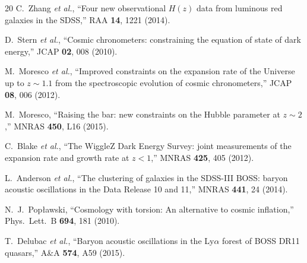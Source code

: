 \documentclass[twocolumn,prd,superscriptaddress,nofootinbib]{revtex4-2}
\begin{document}
\begin{thebibliography}{20}
C.~Zhang \textit{et al.},
``Four new observational $H(z)$ data from luminous red galaxies in the SDSS,''
RAA \textbf{14}, 1221 (2014).

D.~Stern \textit{et al.},
``Cosmic chronometers: constraining the equation of state of dark energy,''
JCAP \textbf{02}, 008 (2010).

M.~Moresco \textit{et al.},
``Improved constraints on the expansion rate of the Universe up to $z \sim 1.1$ from the spectroscopic evolution of cosmic chronometers,''
JCAP \textbf{08}, 006 (2012).

M.~Moresco,
``Raising the bar: new constraints on the Hubble parameter at $z \sim 2$,''
MNRAS \textbf{450}, L16 (2015).

C.~Blake \textit{et al.},
``The WiggleZ Dark Energy Survey: joint measurements of the expansion rate and growth rate at $z < 1$,''
MNRAS \textbf{425}, 405 (2012).

L.~Anderson \textit{et al.},
``The clustering of galaxies in the SDSS-III BOSS: baryon acoustic oscillations in the Data Release 10 and 11,''
MNRAS \textbf{441}, 24 (2014).

N.~J.~Pop{\l}awski,
``Cosmology with torsion: An alternative to cosmic inflation,''
Phys.\ Lett.\ B \textbf{694}, 181 (2010).

T.~Delubac \textit{et al.},
``Baryon acoustic oscillations in the Ly$\alpha$ forest of BOSS DR11 quasars,''
A\&A \textbf{574}, A59 (2015).

\end{thebibliography}
\end{document}
